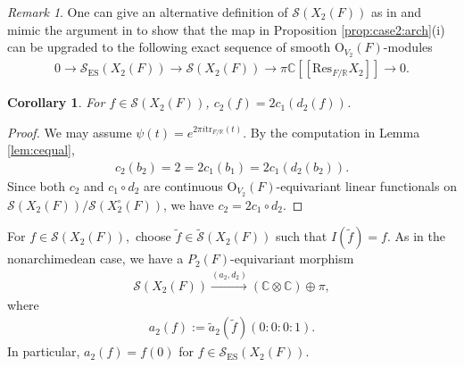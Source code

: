 \documentclass[11pt,a4paper,reqno]{amsart}
\newtheorem{cor}[thm]{Corollary}
\theoremstyle{remark}
\newtheorem*{rem}{Remark}
\numberwithin{equation}{section}
\newcommand{\SL}{\mathrm{SL}}
\newcommand{\CC}{\mathbb{C}}
\newcommand{\RR}{\mathbb{R}}
\theoremstyle{definition}
\numberwithin{equation}{section}
\begin{document}
\begin{rem}
One can give an alternative definition of $\mathcal{S}(X_2(F))$ as in \cite[\S 5.2]{Getz:Hsu:Leslie} and mimic the argument in \cite[\S 5]{Hsu:asymptotics} to show that the map in Proposition \ref{prop:case2:arch}(i) can be upgraded to the following exact sequence of smooth $\mathrm{O}_{V_2}(F)$-modules
        \begin{align*}
        0\longrightarrow\mathcal{S}_{\mathrm{ES}}(X_{2}(F))\longrightarrow\mathcal{S}(X_{2}(F))\longrightarrow \pi \CC[[\mathrm{Res}_{F/\RR}X_{2}]]\longrightarrow 0.
    \end{align*}
\end{rem}

\begin{cor}\label{cor:2eq1:arch}
For $f\in \mathcal{S}(X_{2}(F))$, $c_2(f)=2c_1(d_2(f))$.
\end{cor}

\begin{proof}
    We may assume $\psi(t)=e^{2\pi i\mathrm{tr}_{F/\RR}(t)}.$ By the computation in Lemma \ref{lem:cequal},
    \begin{align*}
        c_2(b_2)= 2=2c_{1}(b_1)=2c_1(d_2(b_2)).
    \end{align*}
    Since both $c_2$ and $c_1\circ d_2$ are continuous $\mathrm{O}_{V_2}(F)$-equivariant linear functionals on $\mathcal{S}(X_2(F))/\mathcal{S}(X_2^\circ(F))$, we have $c_2=2c_1\circ d_2.$
\end{proof}

 For $f\in \mathcal{S}(X_2(F)),$ choose $\tilde{f}\in \widetilde{\mathcal{S}}(X_2(F))$ such that $I(\tilde{f})=f$. As in the nonarchimedean case, we have a $P_2(F)$-equivariant morphism
\begin{align*} 
  \mathcal{S}(X_{2}(F))\xrightarrow{(a_2, d_2)} (\CC\otimes\CC)\oplus \pi,
\end{align*}
where
\begin{align*}
    a_2(f):=\tilde{a}_2(\tilde{f})(0:0:0:1).
\end{align*}
In particular,  $a_2(f)=f(0)$ for $f\in \mathcal{S}_{\mathrm{ES}}(X_{2}(F)).$
\end{document}
